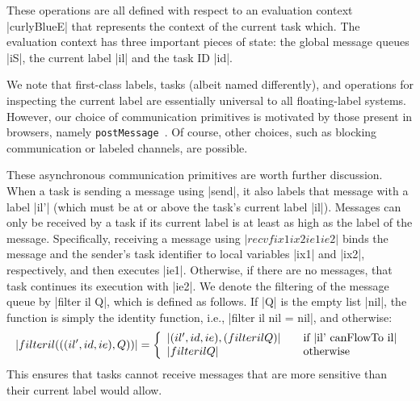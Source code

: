These operations are all defined with respect to an evaluation context
|curlyBlueE| that represents the context of the current task which.
The evaluation context has three important pieces of
state: the global message queues |iS|, the current label |il| and the task ID |id|.

We note that first-class labels, tasks (albeit named differently), and
operations for inspecting the current label are essentially universal to
all floating-label systems.
%
However, our choice of communication primitives is motivated by
those present in browsers, namely \texttt{postMessage}~\cite{webmessaging}.
%
Of course, other choices, such as blocking communication or labeled channels,
are possible. %
%

These asynchronous communication primitives are worth further
discussion.  When a task is sending a message using |send|, it also labels that
message with a label |il'| (which must be at or above the task's current label |il|).
Messages can only be received by a task if its current label is
at least as high as the label of the message.
Specifically, receiving a message using
$|recvf ix1 ix2 ie1 ie2|$
binds the message and the sender's task identifier
to local variables |ix1| and |ix2|, respectively, and then executes |ie1|.
Otherwise, if there are no messages, that task continues its execution with |ie2|.
We denote the filtering of the message queue by |filter il Q|,
which is defined as follows.
If |Q| is the empty list |nil|, the
function is simply the identity function, i.e.,
|filter il nil = nil|, and otherwise:
\[
|filter il (((il', id, ie) , Q) )| = \left\{
\begin{array}{l l}
|(il', id, ie) , (filter il Q)| & \quad \text{if |il' canFlowTo il|}\\
|filter il Q| & \quad \text{otherwise}
\end{array} \right.
\]
This ensures that tasks cannot receive messages that are more sensitive
than their current label would allow.

